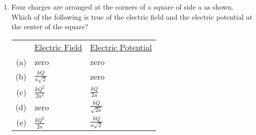 \documentclass{../../oss-apphys}
\begin{document}
\begin{multicols}{2}
\begin{enumerate}[leftmargin=18pt]
  \item Four charges are arranged at the corners of a square of side a as shown.
    Which of the following is true of the electric field and the electric
    potential at the center of the square?
    \begin{center}
      \begin{tabular}{rll}
        & \underline{Electric Field} & \underline{Electric Potential}\\
        (a) & zero & zero \\
        (b) & $\frac{kQ}{a\sqrt{2}}$ & zero \\
        (c) & $\frac{kQ^2}{2a^2}$ &  $\frac{kQ}{2a}$\\
        (d) & zero &  $\frac{kQ}{\sqrt{2a}}$\\
        (e) & $\frac{kQ^2}{2a}$ & $\frac{kQ}{a\sqrt{2}}$
      \end{tabular}
    \end{center}
    

\end{enumerate}
\end{multicols}
\end{document}
